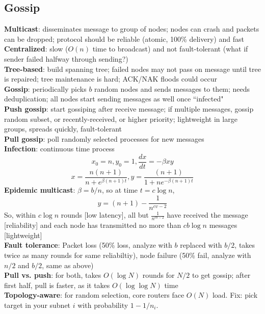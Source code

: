 \documentclass{article}
\begin{document}
\begin{multicols*}{3}
\section{Gossip}
\textbf{Multicast}: disseminates message to group of nodes; nodes can crash and packets can be dropped; protocol should be reliable (atomic, 100\% delivery) and fast \\
\textbf{Centralized}: slow ($O(n)$ time to broadcast) and not fault-tolerant (what if sender failed halfway through sending?) \\
\textbf{Tree-based}: build spanning tree; failed nodes may not pass on message until tree is repaired; tree maintenance is hard; ACK/NAK floods could occur \\
\textbf{Gossip}: periodically picks $b$ random nodes and sends messages to them; needs deduplication; all nodes start sending messages as well once ``infected" \\
\textbf{Push gossip}: start gossiping after receive message; if multiple messages, gossip random subset, or recently-received, or higher priority; lightweight in large groups, spreads quickly, fault-tolerant \\
\textbf{Pull gossip}: poll randomly selected processes for new messages \\
\textbf{Infection}: continuous time process
$$x_0 = n, y_0 = 1, \dfrac{dx}{dt} = -\beta x y$$
$$x = \dfrac{n(n+1)}{n+e^{\beta(n+1)t}}, y = \dfrac{(n+1)}{1 + ne^{-\beta(n+1)t}}$$
\textbf{Epidemic multicast}: $\beta = b/n$, so at time $t=c\log{n}$,
$$y = (n+1) - \dfrac{1}{n^{cv-2}}$$
So, within $c\log{n}$ rounds [low latency], all but $\frac{1}{n^{cb-2}}$ have received the message [reliability] and each node has transmitted no more than $cb\log{n}$ messages [lightweight] \\
\textbf{Fault tolerance}: Packet loss (50\% loss, analyze with $b$ replaced with $b/2$, takes twice as many rounds for same reliabiltiy), node failure (50\% fail, analyze with $n/2$ and $b/2$, same as above) \\
\textbf{Pull vs. push}: for both, takes $O(\log{N})$ rounds for $N/2$ to get gossip; after first half, pull is faster, as it takes $O(\log{\log{N}})$ time \\
\textbf{Topology-aware}: for random selection, core routers face $O(N)$ load. Fix: pick target in your subnet $i$ with probability $1-1/n_i$.


\end{multicols*}
\end{document}
